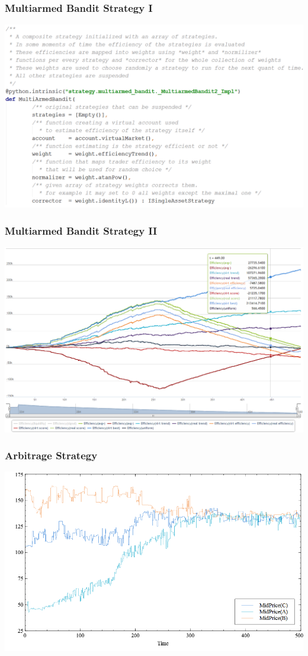 \documentclass{beamer}
\begin{document}
\begin{frame}
\frametitle{Multiarmed Bandit Strategy I}
\includegraphics[width=1\linewidth]{multiarmedbandit_strategy.png}
\end{frame}
\begin{frame}
\frametitle{Multiarmed Bandit Strategy II}
\includegraphics[width=1\linewidth]{multiarmedbandit.png}
\end{frame}
\begin{frame}
\frametitle{Arbitrage Strategy}
\includegraphics[width=1\linewidth]{Arbitrage.png}
\end{frame}
\end{document}
